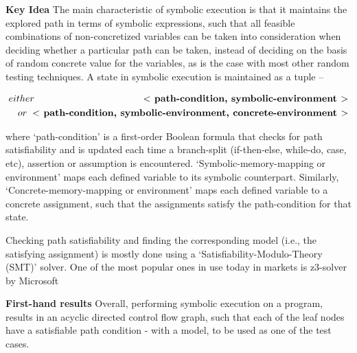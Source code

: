\documentclass[11pt]{llncs}
\begin{document}
	\vspace{2mm}

	\textbf{Key Idea} The main characteristic of symbolic execution is that it maintains the explored path in terms of symbolic expressions, such that all feasible combinations of non-concretized variables can be taken into consideration when deciding whether a particular path can be taken, instead of deciding on the basis of random concrete value for the variables, as is the case with most other random testing techniques. A state in symbolic execution is maintained as a tuple – \cite{2_Survey_SE}

	\vspace{-1mm}

	\begin{equation}
		\begin{split}
			either	\hspace{40mm} \textbf{$ < $ path-condition, symbolic-environment $ > $} \\
			or 	\hspace{2mm} \textbf{$ < $ path-condition, symbolic-environment, concrete-environment $ > $}
		\end{split}
	\end{equation}
	
	where ‘path-condition’ is a first-order Boolean formula that checks for path satisfiability and is updated each time a branch-split (if-then-else, while-do, case, etc), assertion or assumption is encountered. ‘Symbolic-memory-mapping or environment’ maps each defined variable to its symbolic counterpart. Similarly, ‘Concrete-memory-mapping or environment’ maps each defined variable to a concrete assignment, such that the assignments satisfy the path-condition for that state.

	\vspace{2mm}

	Checking path satisfiability and finding the corresponding model (i.e., the satisfying assignment) is mostly done using a ‘Satisfiability-Modulo-Theory (SMT)’ solver. One of the most popular ones in use today in markets is z3-solver by Microsoft \cite{6_MS_Z3}

	\vspace{2mm}

	\textbf{First-hand results} Overall, performing symbolic execution on a program, results in an acyclic directed control flow graph, such that each of the leaf nodes have a satisfiable path condition - with a model, to be used as one of the test cases. \cite{4_TP_SE}
\end{document}

